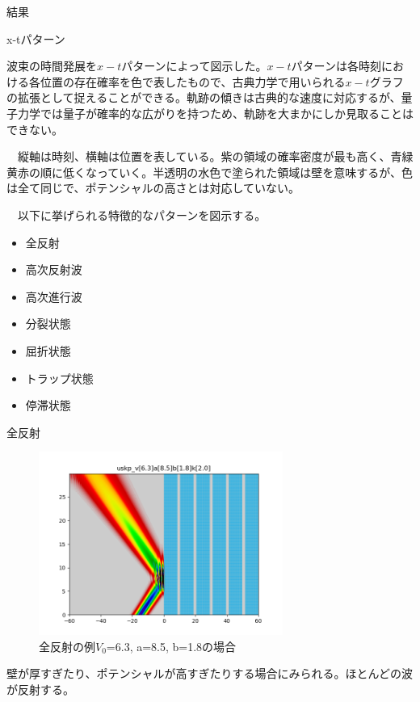 \documentclass[a4paper, lualatex]{bxjsarticle}
\begin{document}
\begin{section}{結果}
    \begin{subsection}{x-tパターン}
        \par 波束の時間発展を$x-t$パターンによって図示した。$x-t$パターンは各時刻における各位置の存在確率を色で表したもので、古典力学で用いられる$x-t$グラフの拡張として捉えることができる。軌跡の傾きは古典的な速度に対応するが、量子力学では量子が確率的な広がりを持つため、軌跡を大まかにしか見取ることはできない。
        \par　縦軸は時刻、横軸は位置を表している。紫の領域の確率密度が最も高く、青緑黄赤の順に低くなっていく。半透明の水色で塗られた領域は壁を意味するが、色は全て同じで、ポテンシャルの高さとは対応していない。
        \par　以下に挙げられる特徴的なパターンを図示する。
        \begin{itemize}
            \item 全反射
            \item 高次反射波
            \item 高次進行波
            \item 分裂状態
            \item 屈折状態
            \item トラップ状態
            \item 停滞状態
        \end{itemize}
    \end{subsection}
    \begin{subsection}{全反射}
        \begin{figure}[h]
            \centering
            \includegraphics[width=8cm]{zenhansha.png}
            \caption{全反射の例$V_0$=6.3, a=8.5, b=1.8の場合}
        \end{figure}
    \par 壁が厚すぎたり、ポテンシャルが高すぎたりする場合にみられる。ほとんどの波が反射する。
    \end{subsection}

\end{section}
\end{document}

